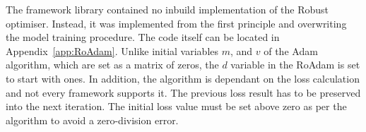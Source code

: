 
%
%
The framework library contained no inbuild implementation of the Robust optimiser.
Instead, it was implemented from the first principle and overwriting the model training procedure.
%
%
{
The code itself can be located in Appendix~\ref{app:RoAdam}.
}
{}
Unlike initial variables $m$, and $v$ of the Adam algorithm, which are set as a matrix of zeros, the $d$ variable in the RoAdam is set to start with ones.
In addition, the algorithm is dependant on the loss calculation and not every framework supports it.
The previous loss result has to be preserved into the next iteration.
The initial loss value must be set above zero as per the algorithm to avoid a zero-division error.